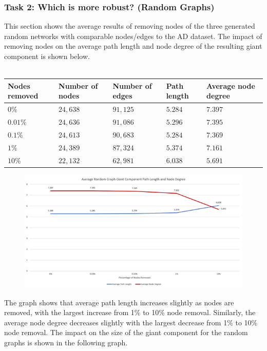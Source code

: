 \documentclass[conference]{IEEEtran}
\begin{document}
		\subsubsection{Task 2: Which is more robust? (Random Graphs)}
			{
				This section shows the average results of removing nodes of the three generated random networks with comparable nodes/edges to the AD dataset. The impact of removing nodes on the average path length and node degree of the resulting giant component is shown below. \\ \\
				\begin{tabularx}{0.95\linewidth}{| X | X | X | X | X |}
					\hline
					\textbf{Nodes removed} & \textbf{Number of nodes} & \textbf{Number of edges} & \textbf{Path length} & \textbf{Average node degree} \\ \hline
					$0\%$ & $24,638$ & $91,125$ & $5.284$ & $7.397$ \\ \hline
					$0.01\%$ & $24,636$ & $91,086$ & $5.296$ & $7.395$ \\ \hline
					$0.1\%$ & $24,613$ & $90,683$ & $5.284$ & $7.369$ \\ \hline
					$1\%$ & $24,389$ & $87,324$ & $5.374$ & $7.161$ \\ \hline
					$10\%$ & $22,132$ & $62,981$ & $6.038$ & $5.691$ \\ \hline
				\end{tabularx}
			\par}
			\begin{figure}[htbp]
				\centerline{\includegraphics[width=\linewidth]{./images/robust_random_path.png}}
				\label{robust_random_path}
			\end{figure}
			{
				The graph shows that average path length increases slightly as nodes are removed, with the largest increase from 1\% to 10\% node removal. Similarly, the average node degree decreases slightly with the largest decrease from 1\% to 10\% node removal. The impact on the size of the giant component for the random graphs is shown in the following graph.
			\par}
\end{document}

